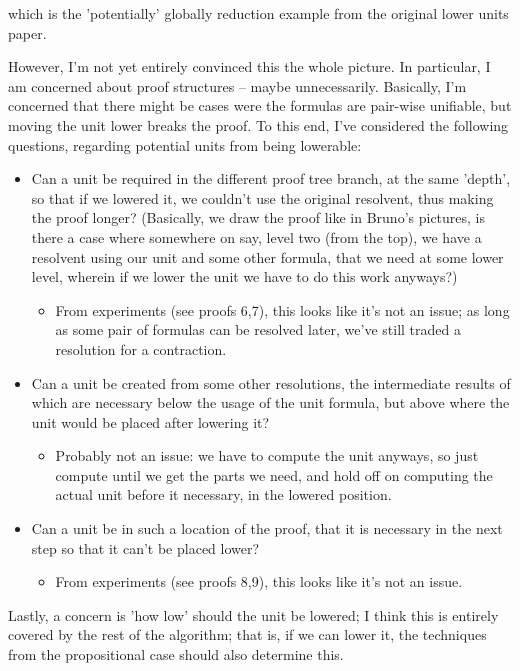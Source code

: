 \documentclass[12pt]{article}
\begin{document}
which is the 'potentially' globally reduction example from the original lower units paper.

However, I'm not yet entirely convinced this the whole picture. In particular, I am concerned about proof  structures -- maybe unnecessarily. Basically, I'm concerned that there might be cases were the formulas are pair-wise unifiable, but moving the unit lower breaks the proof. To this end, I've considered the following questions, regarding potential units from being lowerable:

\begin{itemize}
\item Can a unit be required in the different proof tree branch, at the same 'depth', so that if we lowered it, we couldn't use the original resolvent, thus making the proof longer? (Basically, we draw the proof like in Bruno's pictures, is there a case where somewhere on say, level two (from the top), we have a resolvent using our unit and some other formula, that we need at some lower level, wherein if we lower the unit we have to do this work anyways?)
\begin{itemize}
\item From experiments (see proofs 6,7), this looks like it's not an issue; as long as some pair of formulas can be resolved later, we've still traded a resolution for a contraction.
\end{itemize}

\item Can a unit be created from some other resolutions, the intermediate results of which are necessary below the usage of the unit formula, but above where the unit would be placed after lowering it?
\begin{itemize}
\item Probably not an issue: we have to compute the unit anyways, so just compute until we get the parts we need, and hold off on computing the actual unit before it necessary, in the lowered position.
\end{itemize}

\item Can a unit be in such a location of the proof, that it is necessary in the next step so that it can't be placed lower?
\begin{itemize}
\item From experiments (see proofs 8,9), this looks like it's not an issue. 
\end{itemize}

\end{itemize}

Lastly, a concern is 'how low' should the unit be lowered; I think this is entirely covered by the rest of the algorithm; that is, if we can lower it, the techniques from the propositional case should also determine this.
\end{document}
